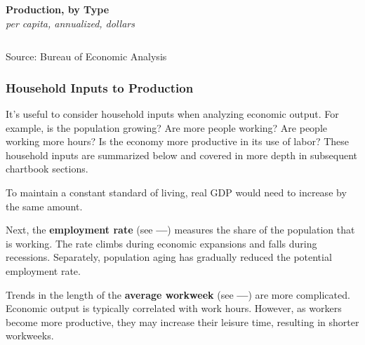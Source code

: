 \documentclass{report}
\begin{document}
\begin{minipage}{1.0\textwidth}
\normalsize \textbf{Production, by Type}\\
\footnotesize{\textit{per capita, annualized, dollars}}\\
\hspace{-3mm}  \setlength{\tabcolsep}{3.7pt} \color{black!90}
		{\renewcommand{\arraystretch}{1.55}
		 \begin{tabular}{p{38mm} R{12.8mm} R{12.8mm} R{12.8mm} R{12.8mm} R{12.8mm}}
			 \hline
		\end{tabular}}
\vspace{-3mm}

\footnotesize{Source: Bureau of Economic Analysis}
\end{minipage}
\newpage
\vspace*{-9mm}

\begin{minipage}{1.0\textwidth}      
\subsubsection*{Household Inputs to Production}
\small It's useful to consider household inputs when analyzing economic output. For example, is the population growing? Are more people working? Are people working more hours? Is the economy more productive in its use of labor? These household inputs are summarized below and covered in more depth in subsequent chartbook sections.

To maintain a constant standard of living, real GDP would need to increase by the same amount. 

Next, the \textbf{employment rate} (see {\color{green!30!teal!80!black}\textbf{---}}) measures the share of the population that is working. The rate climbs during economic expansions and falls during recessions. Separately, population aging has gradually reduced the potential employment rate. 

Trends in the length of the \textbf{average workweek} (see {\color{blue}\textbf{---}}) are more complicated. Economic output is typically correlated with work hours. However, as workers become more productive, they may increase their leisure time, resulting in shorter workweeks. 
\end{minipage}
\vspace{1mm}
\end{document}
